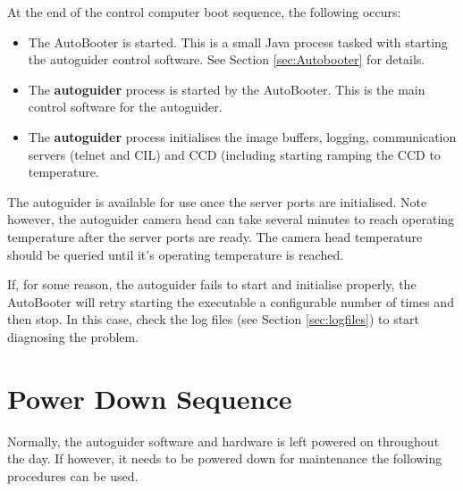 \documentclass[10pt,a4paper]{article}
\begin{document}
At the end of the control computer boot sequence, the following occurs:

\begin{itemize}
\item The AutoBooter is started. This is a small Java process tasked with starting the autoguider control software. See Section \ref{sec:Autobooter} for details.
\item The {\bf autoguider} process is started by the AutoBooter. This is the main control software for the autoguider.
\item The {\bf autoguider} process initialises the image buffers, logging, communication servers (telnet and CIL) and CCD (including starting ramping the CCD to temperature.
\end{itemize}

The autoguider is available for use once the server ports are initialised. Note however, the autoguider camera head can take several minutes to reach operating temperature after the server ports are ready. The camera head temperature should be queried until it's operating temperature is reached.

If, for some reason, the autoguider fails to start and initialise properly, the AutoBooter will retry starting the executable a configurable number of times and then stop. In this case, check the log files (see Section \ref{sec:logfiles}) to start diagnosing the problem.

\section{Power Down Sequence}

Normally, the autoguider software and hardware is left powered on throughout the day. If however, it needs to be powered down for maintenance the following procedures can be used.
\end{document}
